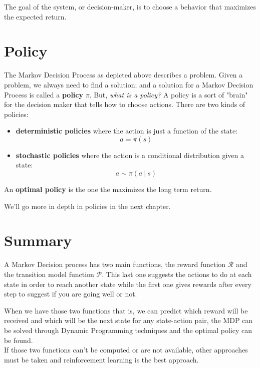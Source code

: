 The goal of the system, or decision-maker, is to choose a behavior that maximizes the expected return.

\section{Policy}
The Markov Decision Process as depicted above describes a problem. Given a problem, we always need to find a solution; and a solution for a Markov Decision Process is called a \textbf{policy} $\mathcal{\pi}$. But, \textit{what is a policy?} A policy is a sort of "brain" for the decision maker that tells how to choose actions. There are two kinds of policies:
\begin{itemize}
    \item \textbf{deterministic policies} where the action is just a function of the state:
    \begin{equation}
        a = \pi(s)
    \end{equation}
    \item \textbf{stochastic policies} where the action is a conditional distribution given a state:
    \begin{equation}
        a \sim \pi(a \ \vert \ s)
    \end{equation}
\end{itemize}

An \textbf{optimal policy} is the one the maximizes the long term return.

We'll go more in depth in policies in the next chapter.

\section{Summary}
A Markov Decision process has two main functions, the reward function $\mathcal{R}$ and the transition model function $\mathcal{P}$. This last one suggests the actions to do at each state in order to reach another state while the first one gives rewards after every step to suggest if you are going well or not.

When we have those two functions that is, we can predict which reward will be received and which will be the next state for any state-action pair, the MDP can be solved through Dynamic Programming techniques and the optimal policy can be found. \\
If those two functions can't be computed or are not available, other approaches must be taken and reinforcement learning is the best approach.